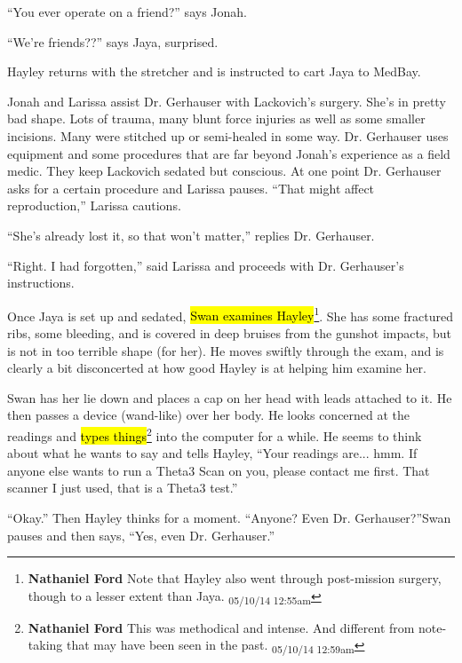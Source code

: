 ``You ever operate on a friend?'' says Jonah.

``We're friends??'' says Jaya, surprised.

Hayley returns with the stretcher and is instructed to cart Jaya to MedBay.





Jonah and Larissa assist Dr. Gerhauser with Lackovich's surgery.  She's in pretty bad shape.  Lots of trauma, many blunt force injuries as well as some smaller incisions.  Many were stitched up or semi-healed in some way.   Dr. Gerhauser uses equipment and some procedures that are far beyond Jonah's experience as a field medic.  They keep Lackovich sedated but conscious.  At one point Dr. Gerhauser asks for a certain procedure and Larissa pauses.  ``That might affect reproduction,'' Larissa cautions.  

``She's already lost it, so that won't matter,'' replies Dr. Gerhauser.

``Right.  I had forgotten,'' said Larissa and proceeds with Dr. Gerhauser's instructions.



Once Jaya is set up and sedated, \hl{Swan examines Hayley}\footnote{\textbf{Nathaniel Ford }Note that Hayley also went through post-mission surgery, though to a lesser extent than Jaya. \textsubscript{05/10/14 12:55am}}.  She has some fractured ribs, some bleeding, and is covered in deep bruises from the gunshot impacts, but is not in too terrible shape (for her).  He moves swiftly through the exam, and is clearly a bit disconcerted at how good Hayley is at helping him examine her.



Swan has her lie down and places a cap on her head with leads attached to it.  He then passes a device (wand-like) over her body.  He looks concerned at the readings and \hl{types things}\footnote{\textbf{Nathaniel Ford }This was methodical and intense. And different from note-taking that may have been seen in the past. \textsubscript{05/10/14 12:59am}} into the computer for a while.  He seems to think about what he wants to say and tells Hayley, ``Your readings are... hmm.  If anyone else wants to run a Theta3 Scan on you, please contact me first.  That scanner I just used, that is a Theta3 test.''

``Okay.''  Then Hayley thinks for a moment.  ``Anyone?  Even Dr. Gerhauser?''Swan pauses and then says, ``Yes, even Dr. Gerhauser.''

